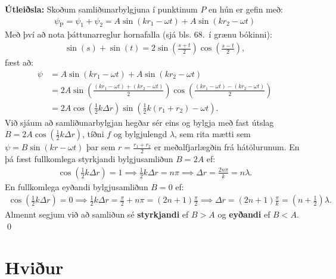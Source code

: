 \ifdefined \wholebook \else\documentclass[oneside]{book}\usepackage{EdlBook}\graphicspath{{figures/}}
\begin{document}
\textbf{Útleiðsla:} Skoðum samliðunarbylgjuna í punktinum $P$ en hún er gefin með:
\begin{align*}
    \psi_{\text{P}} = \psi_1 + \psi_2 = A \sin(k r_1 - \omega t) +  A \sin(k r_2 - \omega t)
\end{align*}
Með því að nota þáttunarreglur hornafalla (sjá bls. 68.~í grænu bókinni):
\begin{align*}
    \sin(s) + \sin(t) = 2\sin(\frac{s+t}{2})\cos(\frac{s-t}{2}),
\end{align*}
fæst að:
\begin{align*}
    \psi &= A \sin(k r_1 - \omega t) +  A \sin(k r_2 - \omega t) \\
    &= 2A\sin(\frac{\left(kr_1 - \omega t\right) + \left(k r_2 -\omega t\right)}{2})\cos(\frac{\left( k r_1 - \omega t \right) - \left( kr_2 - \omega t \right)}{2}) \\
    &= 2A\cos(\frac{1}{2}k\Delta r)\sin(\frac{1}{2}k(r_1+r_2)-\omega t).
\end{align*}
Við sjáum að samliðunarbylgjan hegðar sér eins og bylgja með fast útslag $B = 2A\cos(\frac{1}{2}k\Delta r)$, tíðni $f$ og bylgjulengd $\lambda$, sem rita mætti sem $\psi = B\sin(kr - \omega t)$ þar sem $r =  \frac{r_1 + r_2}{2}$ er meðalfjarlægðin frá hátölurunum. En þá fæst fullkomlega styrkjandi bylgjusamliðun $B = 2A$ ef:
\begin{align*}
    \cos(\frac{1}{2}k\Delta r) = 1 \implies \frac{1}{2}k\Delta r = n\pi \implies \Delta r = \frac{2n\pi}{k} = n\lambda.
\end{align*}
En fullkomlega eyðandi bylgjusamliðun $B = 0$ ef:
\begin{align*}
    \cos(\frac{1}{2}k\Delta r) = 0 \implies \frac{1}{2}k\Delta r = \frac{\pi}{2} + n\pi = (2n+1)\frac{\pi}{2} \implies \Delta r = (2n +1)\frac{\pi}{k} = \left(n + \frac{1}{2}\right)\lambda.
\end{align*}
Almennt segjum við að samliðun sé \textbf{styrkjandi} ef $B > A$ og \textbf{eyðandi} ef $B < A$. \qed


\section{Hviður}
\end{document}
